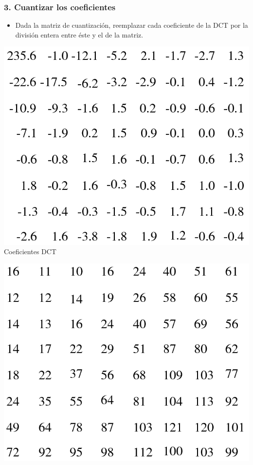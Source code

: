 \documentclass{beamer}
\begin{document}
\begin{frame}
    \frametitle{3. Cuantizar los coeficientes}
    \begin{itemize}
        \item Dada la matriz de cuantización, reemplazar cada coeficiente de la DCT por
            la división entera entre éste y el de la matriz.
    \end{itemize}

    \vfill

    \begin{minipage}[t]{0.3\linewidth}
        \begin{center}
            \includegraphics[scale=0.175]{fig/DCT_coefs.png}\\
            \small Coeficientes DCT
        \end{center}
    \end{minipage}
    \hfill
    \begin{minipage}[t]{0.3\linewidth}
        \begin{center}
            \includegraphics[scale=0.175]{fig/QTable.png}\\

\end{center}
\end{minipage}
\end{frame}
\end{document}
